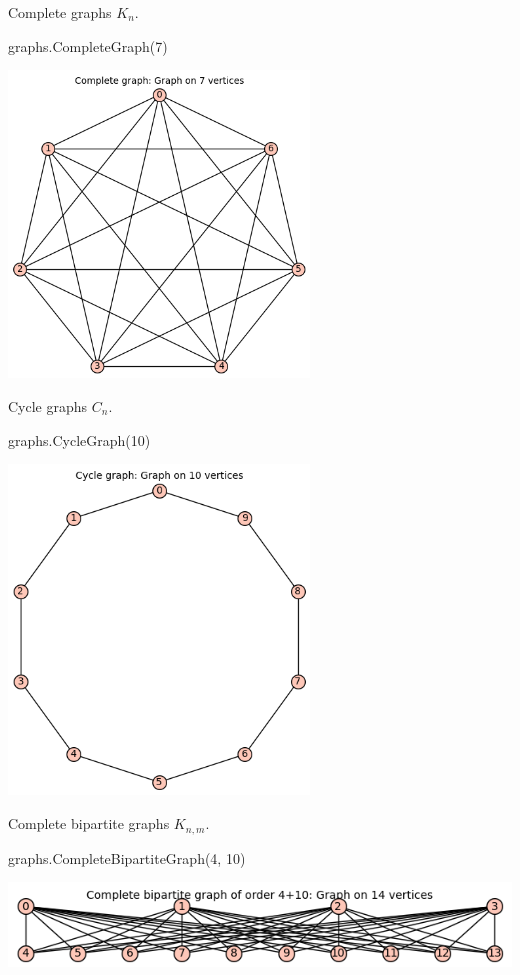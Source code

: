Complete graphs $K_n$.
\begin{sageCell}
    graphs.CompleteGraph(7)
\end{sageCell}
\begin{outImage}
    \includegraphics[width=8cm]{Images/Introduction/output_complete_7.png}
\end{outImage}

Cycle graphs $C_n$.
\begin{sageCell}
    graphs.CycleGraph(10)
\end{sageCell}
\begin{outImage}
    \includegraphics[width=8cm]{Images/Introduction/output_cycle_10.png}
\end{outImage}

Complete bipartite graphs $K_{n,m}$.
\begin{sageCell}
    graphs.CompleteBipartiteGraph(4, 10)
\end{sageCell}
\begin{outImage}
    \includegraphics[width=0.8\linewidth]{Images/Introduction/output_complete_bipartite_4_10.png}
\end{outImage}

